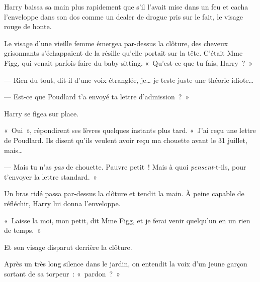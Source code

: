 Harry baissa sa main plus rapidement que s'il l'avait mise dans un feu et cacha l'enveloppe dans son dos comme un dealer de drogue pris sur le fait, le visage rouge de honte.

Le visage d'une vieille femme émergea par-dessus la clôture, des cheveux grisonnants s'échappaient de la résille qu'elle portait sur la tête.  C'était Mme Figg, qui venait parfois faire du baby-sitting. «~Qu'est-ce que tu fais, Harry~?~»

--- Rien du tout, dit-il d'une voix étranglée, je… je teste juste une théorie idiote…

--- Est-ce que Poudlard t'a envoyé ta lettre d'admission~?~»

Harry se figea sur place.

«~Oui~», répondirent ses lèvres quelques instants plus tard.  «~J'ai reçu une lettre de Poudlard. Ils disent qu'ils veulent avoir reçu ma chouette avant le 31 juillet, mais…

--- Mais tu n'as \emph{pas} de chouette. Pauvre petit~!  Mais à quoi \emph{pensent}-t-ils, pour t'envoyer la lettre standard.~»

Un bras ridé passa par-dessus la clôture et tendit la main. À peine capable de réfléchir, Harry lui donna l'enveloppe.

«~Laisse la moi, mon petit, dit Mme Figg, et je ferai venir quelqu'un en un rien de temps.~»

Et son visage disparut derrière la clôture.

Après un très long silence dans le jardin, on entendit la voix d'un jeune garçon sortant de sa torpeur~: «~pardon~?~»
